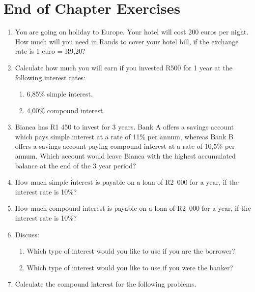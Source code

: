             \section{ End of Chapter Exercises}
            \nopagebreak
            \label{m39335*id75641}\begin{enumerate}[noitemsep, label=\textbf{\arabic*}. ] 
            \label{m39335*uid79}\item You are going on holiday to Europe. Your hotel will cost 200 euros per night. How much will you need in Rands to cover your hotel bill, if the exchange rate is 1 euro = R9,20?\newline
\label{m39335*uid80}\item Calculate how much you will earn if you invested R500 for 1 year at the following interest rates:
\label{m39335*id75671}\begin{enumerate}[noitemsep, label=\textbf{\alph*}. ] 
            \label{m39335*uid81}\item 6,85\% simple interest.
\label{m39335*uid82}\item 4,00\% compound interest.
\end{enumerate}
\label{m39335*uid83}\item Bianca has R1 450 to invest for 3 years. Bank A offers a savings account which pays simple interest at a rate of 11\% per annum, whereas Bank B offers a savings account paying compound interest at a rate of 10,5\% per annum. Which account would leave Bianca with the highest accumulated balance at the end of the 3 year period?\newline
\label{m39335*uid84}\item How much simple interest is payable on a loan of R2~000 for a year, if the interest rate is 10\%?\newline
\label{m39335*uid85}\item How much compound interest is payable on a loan of R2~000 for a year, if the interest rate is 10\%?\newline
\label{m39335*uid86}\item Discuss:
\label{m39335*id75754}\begin{enumerate}[noitemsep, label=\textbf{\alph*}. ] 
            \label{m39335*uid87}\item Which type of interest would you like to use if you are the borrower?
\label{m39335*uid88}\item Which type of interest would you like to use if you were the banker?
\end{enumerate}
\label{m39335*uid89}\item Calculate the compound interest for the following problems.

\end{enumerate}
